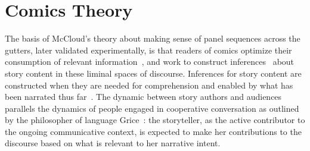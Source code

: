 \section{Comics Theory}

The basis of McCloud's theory about making sense of panel sequences across
the gutters, later validated experimentally, is that
readers of comics optimize their
consumption of relevant information~\cite{pirolli2007information}, and work
to construct inferences~\cite{magliano2016filling} about story content in
these liminal spaces of discourse.
Inferences for story content are constructed when
they are needed for comprehension and enabled by what has
been narrated thus far~\cite{myers1987degree}. The dynamic
between story authors and audiences parallels the dynamics of people
engaged in cooperative conversation as outlined by the philosopher of
language Grice~\cite{grice1975logic}: the storyteller, as the active contributor
to the ongoing communicative context, is expected to make her contributions
to the discourse based on what is relevant to her narrative intent. 
% 
% 


